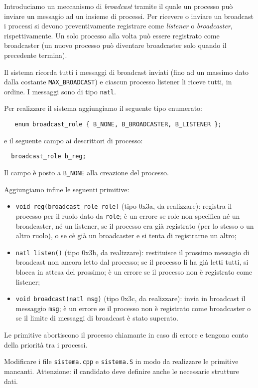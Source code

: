 Introduciamo un meccanismo di {\em broadcast} tramite il quale
un processo pu\`o inviare un messagio ad un insieme di processi.
Per ricevere o inviare un broadcast i processi si devono preventivamente
registrare come {\em listener} o {\em broadcaster}, rispettivamente.
Un solo processo alla volta pu\`o essere registrato come broadcaster
(un nuovo processo pu\`o diventare broadcaster solo quando il precedente
termina).

Il sistema ricorda tutti i messaggi di broadcast inviati (fino ad un
massimo dato dalla costante \verb|MAX_BROADCAST|) e ciascun processo
listener li riceve tutti, in ordine. I messaggi sono di tipo \verb|natl|.

Per realizzare il sistema aggiungiamo il seguente tipo enumerato:

\begin{verbatim}
   enum broadcast_role { B_NONE, B_BROADCASTER, B_LISTENER };
\end{verbatim}

e il seguente campo ai descrittori di processo:
\begin{verbatim}
  broadcast_role b_reg;
\end{verbatim}
Il campo \`e posto a \verb|B_NONE| alla creazione del processo.

Aggiungiamo infine le seguenti primitive:
\begin{itemize}
   \item \verb|void reg(broadcast_role role)| (tipo 0x3a, da realizzare):
   	registra il processo per il ruolo dato da \verb|role|; \`e un errore se role non specifica n\'e un broadcaster,
	n\'e un listener, se il processo era gi\`a registrato (per lo stesso o un altro ruolo), o se c\`e gi\`a un
	broadcaster e si tenta di registrarne un altro;
   \item \verb|natl listen()| (tipo 0x3b, da realizzare):
   	restituisce il prossimo messagio di broadcast non ancora letto dal processo; se il processo li ha gi\`a
	letti tutti, si blocca in attesa del prossimo; \`e un errore se il processo non \`e registrato come
	listener;
   \item \verb|void broadcast(natl msg)| (tipo 0x3c, da realizzare): 
   	invia in broadcast il messaggio \verb|msg|; \`e un errore se il processo non \`e registrato come broadcaster
	o se il limite di messaggi di broadcast \`e stato superato.
\end{itemize}

Le primitive abortiscono il processo chiamante in caso di errore e tengono conto della priorit\`a tra i processi.

Modificare i file \verb|sistema.cpp| e \verb|sistema.S| in modo da realizzare le primitive mancanti.
Attenzione: il candidato deve definire anche le necessarie strutture dati.
